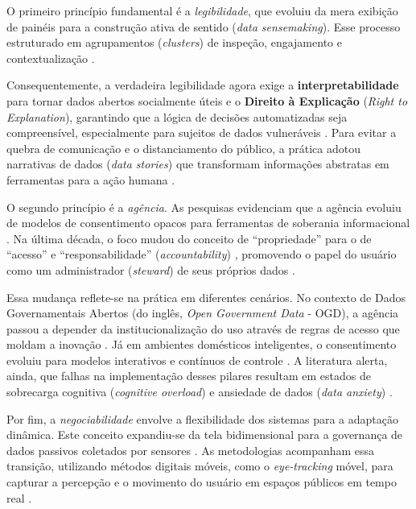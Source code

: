 \documentclass[
	12pt,				%
	oneside,			%
	a4paper,			%
	english,			%
	brazil				%
	]{abntex2ppgsi}
\begin{document}
    O primeiro princípio fundamental é a \emph{legibilidade}, que evoluiu da mera exibição de painéis para a construção ativa de sentido (\textit{data sensemaking}). Esse processo estruturado em agrupamentos (\textit{clusters}) de inspeção, engajamento e contextualização \cite{casado2022sonification, capeleti2023heuristic, Yuan20243615, Sailaja2021Designing, Xiao2021, Koesten2021, Haghighati2020, Koesten2020, Hornung}.
    
    Consequentemente, a verdadeira legibilidade agora exige a \textbf{interpretabilidade} para tornar dados abertos socialmente úteis \cite{barcellos2022towards} e o \textbf{Direito à Explicação} (\textit{Right to Explanation}), garantindo que a lógica de decisões automatizadas seja compreensível, especialmente para sujeitos de dados vulneráveis \cite{malgieri2020vulnerable, malgieri2019automated, Victorelli2020Human, DeAlmeida2019}. Para evitar a quebra de comunicação e o distanciamento do público, a prática adotou narrativas de dados (\textit{data stories}) que transformam informações abstratas em ferramentas para a ação humana \cite{ferreira2024connecting}.
    
    O segundo princípio é a \emph{agência}. As pesquisas evidenciam que a agência evoluiu de modelos de consentimento opacos para ferramentas de soberania informacional \cite{coleti2024human, Meechan2023, Elliot2023, Hutton2017, Mashhadi2014}. Na última década, o foco mudou do conceito de ``propriedade'' para o de ``acesso'' e ``responsabilidade'' (\textit{accountability}) \cite{janecek2018ownership}, promovendo o papel do usuário como um administrador (\textit{steward}) de seus próprios dados \cite{angelopoulos2021stewardship}.
    
    Essa mudança reflete-se na prática em diferentes cenários. No contexto de Dados Governamentais Abertos (do inglês, \textit{Open Government Data} - OGD), a agência passou a depender da institucionalização do uso através de regras de acesso que moldam a inovação \cite{mu2024institutional}. Já em ambientes domésticos inteligentes, o consentimento evoluiu para modelos interativos e contínuos de controle \cite{chalhoub2024useful}. A literatura alerta, ainda, que falhas na implementação desses pilares resultam em estados de sobrecarga cognitiva (\textit{cognitive overload}) e ansiedade de dados (\textit{data anxiety}) \cite{cezar2023cognitive}.
    
    Por fim, a \emph{negociabilidade} envolve a flexibilidade dos sistemas para a adaptação dinâmica. Este conceito expandiu-se da tela bidimensional para a governança de dados passivos coletados por sensores \cite{Sailaja2024334, Lenzi2024, Mashhadi2014}. As metodologias acompanham essa transição, utilizando métodos digitais móveis, como o \textit{eye-tracking} móvel, para capturar a percepção e o movimento do usuário em espaços públicos em tempo real \cite{kaufmann2021ethical}.
    
\end{document}

